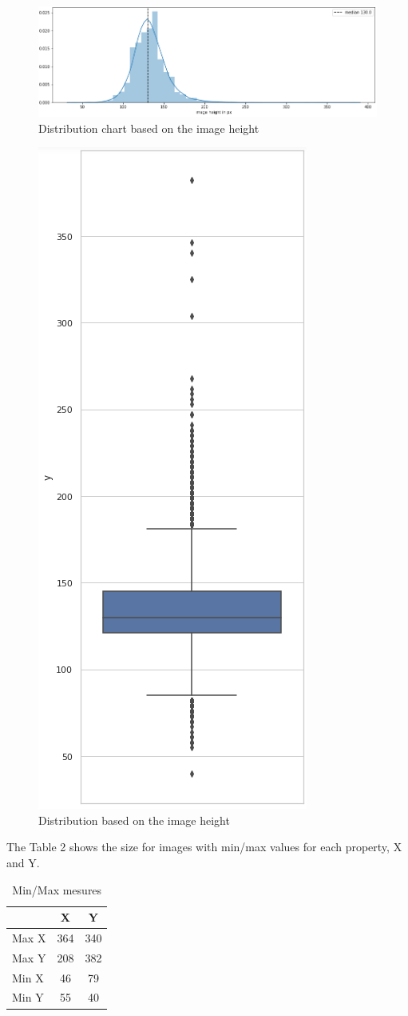 \documentclass[a4paper]{article}
\begin{document}
	\begin{figure}[H]
		\centering
		\includegraphics[width=.9\textwidth]{dist_y.png}
		\caption{Distribution chart based on the image height}
		\label{fig:height_dist}
	\end{figure}
	\begin{figure}[H]
		\centering
		\includegraphics[width=.5\textwidth]{box_y.png}
		\caption{Distribution based on the image height}
		\label{fig:height_box}
	\end{figure}

	\medskip
	The Table 2 shows the size for images with min/max values for each property, X and Y.

	\medskip
	\begin{table}[h!]
		\centering
		\caption{Min/Max mesures}
		\label{tab:minmax}
		\begin{tabular}{l|c|c}
			\textbf{} & {X} & {Y} \\
			\hline
			Max X & 364 & 340 \\
			Max Y & 208 & 382 \\
			Min X & 46 & 79 \\
			Min Y & 55 & 40 \\
		\end{tabular}
	\end{table}
\end{document}
